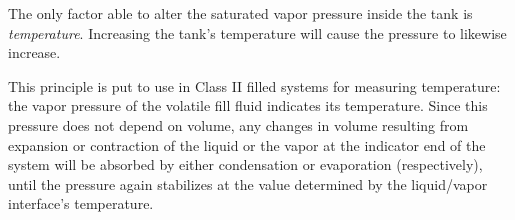 
The only factor able to alter the saturated vapor pressure inside the tank is {\it temperature}.  Increasing the tank's temperature will cause the pressure to likewise increase.

This principle is put to use in Class II filled systems for measuring temperature: the vapor pressure of the volatile fill fluid indicates its temperature.  Since this pressure does not depend on volume, any changes in volume resulting from expansion or contraction of the liquid or the vapor at the indicator end of the system will be absorbed by either condensation or evaporation (respectively), until the pressure again stabilizes at the value determined by the liquid/vapor interface's temperature.











